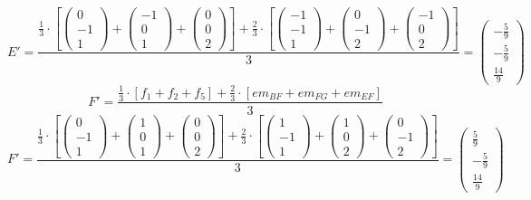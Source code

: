 \documentclass{article}
\begin{document}
\[E'=\frac{\frac{1}{3}\cdot\left[
\left({\begin{array}{c} 0 \\  -1 \\ 1 \end{array}}\right)+
\left({\begin{array}{c} -1 \\  0 \\ 1 \end{array}}\right)+
\left({\begin{array}{c} 0 \\  0 \\ 2 \end{array}}\right)\right]+
\frac{2}{3}\cdot\left[
\left({\begin{array}{c} -1 \\  -1 \\ 1 \end{array}}\right)+
\left({\begin{array}{c} 0 \\  -1 \\ 2 \end{array}}\right)+
\left({\begin{array}{c} -1 \\  0 \\ 2 \end{array}}\right)\right]
}{3}=\left({\begin{array}{c} -\frac{5}{9} \\  -\frac{5}{9} \\ \frac{14}{9} \end{array}}\right)\]
\[F'=\frac{\frac{1}{3}\cdot\left[f_1+f_2+f_5\right]+
\frac{2}{3}\cdot\left[em_{BF}+em_{FG}+em_{EF}\right]
}{3}\]
\[F'=\frac{\frac{1}{3}\cdot\left[
\left({\begin{array}{c} 0 \\  -1 \\ 1 \end{array}}\right)+
\left({\begin{array}{c} 1 \\  0 \\ 1 \end{array}}\right)+
\left({\begin{array}{c} 0 \\  0 \\ 2 \end{array}}\right)\right]+
\frac{2}{3}\cdot\left[
\left({\begin{array}{c} 1 \\  -1 \\ 1 \end{array}}\right)+
\left({\begin{array}{c} 1 \\  0 \\ 2 \end{array}}\right)+
\left({\begin{array}{c} 0 \\  -1 \\ 2 \end{array}}\right)\right]
}{3}=\left({\begin{array}{c} \frac{5}{9} \\  -\frac{5}{9} \\ \frac{14}{9} \end{array}}\right)\]
\end{document}
